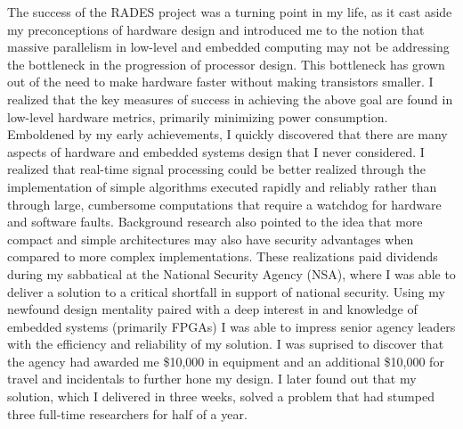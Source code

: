 \documentclass{article}
\begin{document}
The success of the RADES project was a turning point in my life, as it cast
aside my preconceptions of hardware design and introduced me to the notion that
massive parallelism in low-level and embedded computing may not be addressing
the bottleneck in the progression of processor design. This bottleneck has
grown out of the need to make hardware faster without making transistors
smaller. I realized that the key measures of success in achieving the above
goal are found in low-level hardware metrics, primarily minimizing power
consumption. Emboldened by my early achievements, I quickly discovered that
there are many aspects of hardware and embedded systems design that I never
considered. I realized that real-time signal processing could be better
realized through the implementation of simple algorithms executed rapidly and
reliably rather than through large, cumbersome computations that require a
watchdog for hardware and software faults. Background research also pointed
to the idea that more compact and simple architectures may also have security
advantages when compared to more complex implementations. These realizations paid dividends
during my sabbatical at the National Security Agency (NSA), where I was able to
deliver a solution to a critical shortfall in support of national security.
Using my newfound design mentality paired with a deep interest in and knowledge of
embedded systems (primarily FPGAs) I was able to impress senior agency leaders
with the efficiency and reliability of my solution. I was suprised to discover
that the agency had awarded me \$10,000 in equipment and an additional \$10,000
for travel and incidentals to further hone my design. I later found out that my
solution, which I delivered in three weeks, solved a problem that had stumped
three full-time researchers for half of a year. 
\end{document}
